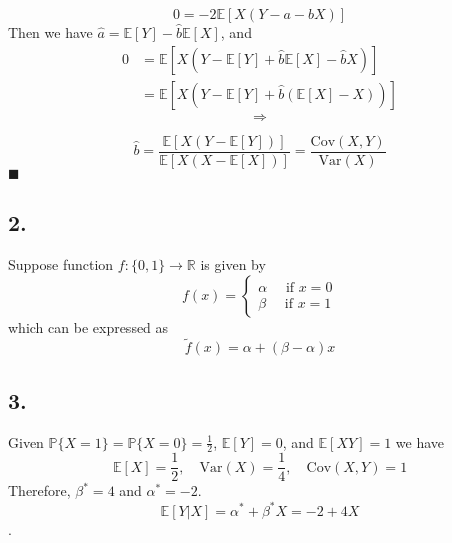 \documentclass[11pt]{article}
\theoremstyle{definition}
\theoremstyle{boldtitle} %
\numberwithin{equation}{section}
\numberwithin{figure}{section}
\numberwithin{table}{section}
\begin{document}
\[
0 = - 2 \mathbb{E}\left[X (Y -a - bX)\right]
\]
Then we have $\hat{a} = \mathbb{E}[Y] - \hat{b}\mathbb{E}[X]$, and 
\begin{align*}
0 & = \mathbb{E}\left[X (Y - \mathbb{E}[Y] + \hat{b}\mathbb{E}[X] - \hat{b}X)\right] \\ 
 & = \mathbb{E}\left[X (Y - \mathbb{E}[Y] + \hat{b}(\mathbb{E}[X] - X)) \right] 
\end{align*}
\[
\Rightarrow
\]

\[
\hat{b} = \frac{\mathbb{E}\left[X (Y - \mathbb{E}[Y] )\right] 
    }{
        \mathbb{E}\left[X(X - \mathbb{E}[X] ) \right] 
    } = \frac{\text{Cov}(X, Y)}{\text{Var}(X)}
\]
\(\blacksquare\)

\subsection*{2.} Suppose function $f: \{0, 1 \} \rightarrow \mathbb{R}$ is given by 
\[
f(x) = 
\begin{cases}
    \alpha \quad \text{ if } x = 0 \\
    \beta \quad  \text{ if } x = 1
\end{cases}
\]
which can be expressed as 
\[
\tilde{f}(x) = \alpha + (\beta - \alpha) x
\]

\subsection*{3.}
Given $\mathbb{P}\{X = 1\} = \mathbb{P}\{X = 0\} = \frac{1}{2}$, $\mathbb{E}[Y]= 0$, and $\mathbb{E}[XY]= 1$
we have 
\[
\mathbb{E}[X] = \frac{1}{2}, \quad \text{Var}(X) = \frac{1}{4}, \quad \text{Cov}(X, Y) = 1
\]
Therefore, $\beta^* = 4$ and $\alpha^* = -2$.
\[
\mathbb{E}[Y|X] = \alpha^* + \beta^* X = -2 + 4X
\].


\end{document}

